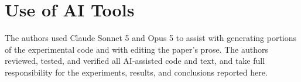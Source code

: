 \section{Use of AI Tools}
The authors used Claude Sonnet 5 and Opus 5 to assist with generating portions of the experimental code and with editing the paper’s prose. The authors reviewed, tested, and verified all AI-assisted code and text, and take full responsibility for the experiments, results, and conclusions reported here.